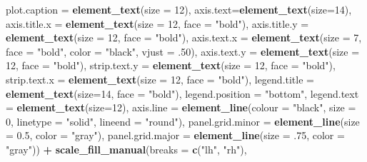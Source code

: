 \documentclass[
]{article}
\newenvironment{Shaded}{\begin{snugshade}}{\end{snugshade}}
\newcommand{\DataTypeTok}[1]{\textcolor[rgb]{0.13,0.29,0.53}{#1}}
\newcommand{\DecValTok}[1]{\textcolor[rgb]{0.00,0.00,0.81}{#1}}
\newcommand{\FloatTok}[1]{\textcolor[rgb]{0.00,0.00,0.81}{#1}}
\newcommand{\KeywordTok}[1]{\textcolor[rgb]{0.13,0.29,0.53}{\textbf{#1}}}
\newcommand{\NormalTok}[1]{#1}
\newcommand{\OperatorTok}[1]{\textcolor[rgb]{0.81,0.36,0.00}{\textbf{#1}}}
\newcommand{\StringTok}[1]{\textcolor[rgb]{0.31,0.60,0.02}{#1}}
\begin{document}
\begin{Shaded}
\begin{Highlighting}[]
{{        \DataTypeTok{plot.caption =} \KeywordTok{element_text}\NormalTok{(}\DataTypeTok{size =} \DecValTok{12}\NormalTok{),}
        \DataTypeTok{axis.text=}\KeywordTok{element_text}\NormalTok{(}\DataTypeTok{size=}\DecValTok{14}\NormalTok{),}
        \DataTypeTok{axis.title.x =} \KeywordTok{element_text}\NormalTok{(}\DataTypeTok{size =} \DecValTok{12}\NormalTok{, }\DataTypeTok{face =} \StringTok{"bold"}\NormalTok{),}
        \DataTypeTok{axis.title.y =} \KeywordTok{element_text}\NormalTok{(}\DataTypeTok{size =} \DecValTok{12}\NormalTok{, }\DataTypeTok{face =} \StringTok{"bold"}\NormalTok{),}
        \DataTypeTok{axis.text.x =} \KeywordTok{element_text}\NormalTok{(}\DataTypeTok{size =} \DecValTok{7}\NormalTok{, }\DataTypeTok{face =} \StringTok{"bold"}\NormalTok{, }\DataTypeTok{color =} \StringTok{"black"}\NormalTok{, }\DataTypeTok{vjust =} \FloatTok{.50}\NormalTok{),}
        \DataTypeTok{axis.text.y =} \KeywordTok{element_text}\NormalTok{(}\DataTypeTok{size =} \DecValTok{12}\NormalTok{, }\DataTypeTok{face =} \StringTok{"bold"}\NormalTok{),}
        \DataTypeTok{strip.text.y =} \KeywordTok{element_text}\NormalTok{(}\DataTypeTok{size =} \DecValTok{12}\NormalTok{, }\DataTypeTok{face =} \StringTok{"bold"}\NormalTok{),}
        \DataTypeTok{strip.text.x =} \KeywordTok{element_text}\NormalTok{(}\DataTypeTok{size =} \DecValTok{12}\NormalTok{, }\DataTypeTok{face =} \StringTok{"bold"}\NormalTok{),}
        \DataTypeTok{legend.title =} \KeywordTok{element_text}\NormalTok{(}\DataTypeTok{size=}\DecValTok{14}\NormalTok{, }\DataTypeTok{face =} \StringTok{"bold"}\NormalTok{), }
        \DataTypeTok{legend.position =} \StringTok{"bottom"}\NormalTok{,}
        \DataTypeTok{legend.text =} \KeywordTok{element_text}\NormalTok{(}\DataTypeTok{size=}\DecValTok{12}\NormalTok{),}
        \DataTypeTok{axis.line =} \KeywordTok{element_line}\NormalTok{(}\DataTypeTok{colour =} \StringTok{"black"}\NormalTok{, }
                                 \DataTypeTok{size =} \DecValTok{0}\NormalTok{, }\DataTypeTok{linetype =} \StringTok{"solid"}\NormalTok{, }\DataTypeTok{lineend =} \StringTok{"round"}\NormalTok{),}
        \DataTypeTok{panel.grid.minor =} \KeywordTok{element_line}\NormalTok{(}\DataTypeTok{size =} \FloatTok{0.5}\NormalTok{, }\DataTypeTok{color =} \StringTok{"gray"}\NormalTok{), }
        \DataTypeTok{panel.grid.major =} \KeywordTok{element_line}\NormalTok{(}\DataTypeTok{size =} \FloatTok{.75}\NormalTok{, }\DataTypeTok{color =} \StringTok{"gray"}\NormalTok{)) }\OperatorTok{+}
\StringTok{  }\KeywordTok{scale_fill_manual}\NormalTok{(}\DataTypeTok{breaks =} \KeywordTok{c}\NormalTok{(}\StringTok{"lh"}\NormalTok{, }\StringTok{"rh"}\NormalTok{), }
}}
\end{Highlighting}
\end{Shaded}
\end{document}
